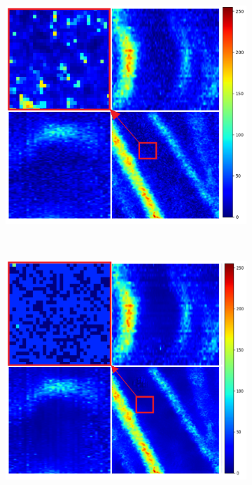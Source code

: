 \begin{figure}[H]
\begin{subfigure}[t]{\dimexpr.5\linewidth-1.3em\relax}
	\end{subfigure}
	\hfill %
	\begin{subfigure}[t]{\dimexpr.5\linewidth-1.3em\relax}
		\centering
		\includegraphics[width=.95\linewidth,valign=t]{my_folder/images/denoising/n2n_part_color.png}
	\end{subfigure}
	\\[20pt]
	\begin{subfigure}[t]{\dimexpr.5\linewidth-1.3em\relax}
		\centering
		\includegraphics[width=.95\linewidth,valign=t]{my_folder/images/denoising/nlm_n2n_part_color.png}

\end{subfigure}
\end{figure}
